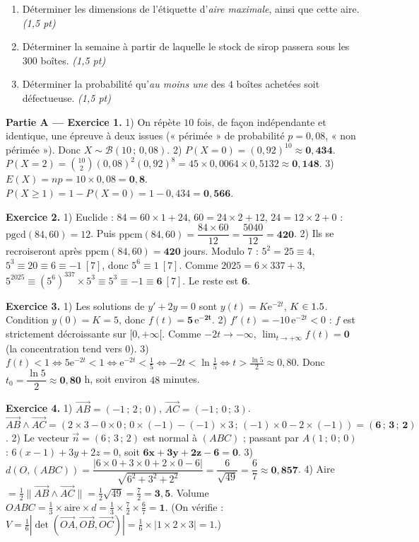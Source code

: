 \begin{enumerate}[label=\textbf{Tâche \arabic*.},leftmargin=2.4em]
\item Déterminer les dimensions de l'étiquette d'\emph{aire maximale}, ainsi que cette aire. \hfill\textit{(1,5 pt)}
\item Déterminer la semaine à partir de laquelle le stock de sirop passera sous les
\SI{300}{} boîtes. \hfill\textit{(1,5 pt)}
\item Déterminer la probabilité qu'\emph{au moins une} des $4$ boîtes achetées soit
défectueuse. \hfill\textit{(1,5 pt)}
\end{enumerate}
\par{}


\noindent\textbf{Partie A — Exercice 1.}
1) On répète $10$ fois, de façon indépendante et identique, une épreuve à deux issues
(« périmée » de probabilité $p=0{,}08$, « non périmée »). Donc $X\sim\mathcal B(10\,;\,0{,}08)$.
2) $P(X{=}0)=(0{,}92)^{10}\approx\mathbf{0{,}434}$.
$P(X{=}2)=\binom{10}{2}(0{,}08)^2(0{,}92)^8=45\times0{,}0064\times0{,}5132\approx\mathbf{0{,}148}$.
3) $E(X)=np=10\times0{,}08=\mathbf{0{,}8}$. $P(X\ge1)=1-P(X{=}0)=1-0{,}434=\mathbf{0{,}566}$.

\noindent\textbf{Exercice 2.}
1) Euclide : $84=60\times1+24$, $60=24\times2+12$, $24=12\times2+0$ : $\mathrm{pgcd}(84,60)=12$.
Puis $\mathrm{ppcm}(84,60)=\dfrac{84\times60}{12}=\dfrac{5040}{12}=\mathbf{420}$.
2) Ils se recroiseront après $\mathrm{ppcm}(84,60)=\mathbf{420}$ jours. Modulo $7$ :
$5^2=25\equiv4$, $5^3\equiv20\equiv6\equiv-1\ [7]$, donc $5^6\equiv1\ [7]$. Comme
$2025=6\times337+3$, $5^{2025}\equiv(5^6)^{337}\times5^3\equiv5^3\equiv-1\equiv\mathbf 6\ [7]$.
Le reste est $\mathbf 6$.

\noindent\textbf{Exercice 3.}
1) Les solutions de $y'+2y=0$ sont $y(t)=K\mathrm e^{-2t}$, $K\in1.5$. Condition $y(0)=K=5$,
donc $f(t)=\mathbf{5\,\mathrm e^{-2t}}$.
2) $f'(t)=-10\,\mathrm e^{-2t}<0$ : $f$ est strictement décroissante sur $[0,+\infty[$.
Comme $-2t\to-\infty$, $\lim_{t\to+\infty}f(t)=\mathbf 0$ (la concentration tend vers $0$).
3) $f(t)<1\iff 5\mathrm e^{-2t}<1\iff\mathrm e^{-2t}<\frac15\iff-2t<\ln\frac15\iff
t>\frac{\ln5}{2}\approx0{,}80$. Donc $t_0=\dfrac{\ln5}{2}\approx\mathbf{0{,}80}$ h, soit environ
$48$ minutes.

\noindent\textbf{Exercice 4.}
1) $\vec{AB}=(-1\,;\,2\,;\,0)$, $\vec{AC}=(-1\,;\,0\,;\,3)$.
$\vec{AB}\wedge\vec{AC}=(2\times3-0\times0\,;\,0\times(-1)-(-1)\times3\,;\,(-1)\times0-2\times(-1))=\mathbf{(6\,;\,3\,;\,2)}$.
2) Le vecteur $\vec n=(6\,;\,3\,;\,2)$ est normal à $(ABC)$ ; passant par $A(1\,;\,0\,;\,0)$ :
$6(x-1)+3y+2z=0$, soit $\mathbf{6x+3y+2z-6=0}$.
3) $d(O,(ABC))=\dfrac{|6\times0+3\times0+2\times0-6|}{\sqrt{6^2+3^2+2^2}}=\dfrac{6}{\sqrt{49}}=\dfrac{6}{7}\approx\mathbf{0{,}857}$.
4) Aire $=\frac12\|\vec{AB}\wedge\vec{AC}\|=\frac12\sqrt{49}=\frac72=\mathbf{3{,}5}$.
Volume $OABC=\frac13\times\text{aire}\times d=\frac13\times\frac72\times\frac67=\mathbf 1$.
(On vérifie : $V=\frac16|\det(\vec{OA},\vec{OB},\vec{OC})|=\frac16\times|1\times2\times3|=1$.)

